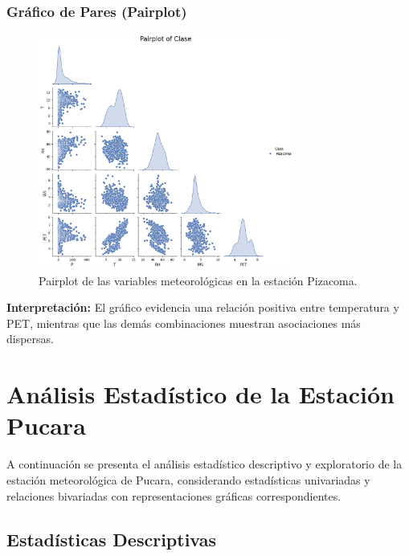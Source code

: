 \subsubsection*{Gráfico de Pares (Pairplot)}
\begin{figure}[htbp]
\centering
\includegraphics[width=0.75\textwidth]{resultados/por_estacion_meteorologica/Pizacoma/pairplot.png}
\caption{Pairplot de las variables meteorológicas en la estación Pizacoma.}
\label{fig:pizacoma_pairplot}
\end{figure}
\textbf{Interpretación:} El gráfico evidencia una relación positiva entre temperatura y PET, mientras que las demás combinaciones muestran asociaciones más dispersas.


\section{Análisis Estadístico de la Estación Pucara}

A continuación se presenta el análisis estadístico descriptivo y exploratorio de la estación meteorológica de Pucara, considerando estadísticas univariadas y relaciones bivariadas con representaciones gráficas correspondientes.

\subsection{Estadísticas Descriptivas}

